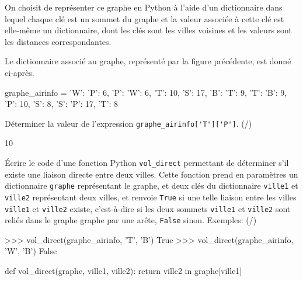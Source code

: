 On choisit de représenter ce graphe en Python à l'aide d'un dictionnaire dans lequel chaque clé est un sommet du graphe et la valeur associée à cette clé est elle-même un dictionnaire, dont les clés sont les villes voisines et les valeurs sont les distances correspondantes.


Le dictionnaire associé au graphe, représenté par la figure précédente, est donné ci-après.

\begin{CodePythontexAlt}[TaillePolice=\large, Largeur=1\linewidth,Centre,Lignes=true,PremLigne=1]{}
graphe_airinfo = {     
    'W': {'P': 6}, 
    'P': {'W': 6, 'T': 10, 'S': 17}, 
    'B': {'T': 9}, 
    'T': {'B': 9, 'P': 10, 'S': 8}, 
    'S': {'P': 17, 'T': 8}     }
    \end{CodePythontexAlt}

\begin{enumerate}[resume=monDS]
    \begin{minipage}{0.69\linewidth}
            \item Déterminer la valeur de l'expression \verb|graphe_airinfo['T']['P']|. (/)

    \end{minipage}\hfill
    \begin{minipage}{0.29\linewidth}
    \begin{blocvisible}[height=1]
     10
\end{blocvisible}
        \end{minipage}
\item Écrire le code d'une fonction Python \texttt{vol\_direct} permettant de déterminer s'il existe une liaison directe entre deux villes. Cette fonction prend en paramètres un dictionnaire \texttt{graphe} représentant le graphe, et deux clés du dictionnaire \texttt{ville1} et \texttt{ville2} représentant deux villes, et renvoie \texttt{True} si une telle liaison entre les villes \texttt{ville1} et \texttt{ville2} existe, c'est-à-dire si les deux sommets \texttt{ville1} et \texttt{ville2} sont reliés dans le graphe graphe par une arête, \texttt{False} sinon. Exemples: (/)
    \begin{CodePythontexAlt}[TaillePolice=\large, Largeur=1\linewidth,Centre,Lignes=true,PremLigne=1]{}
>>> vol_direct(graphe_airinfo, 'T', 'B') 
True 
>>> vol_direct(graphe_airinfo, 'W', 'B') 
False
    \end{CodePythontexAlt}

\begin{blocvisible}[height=3.5]
\begin{CodePythontexAlt}[TaillePolice=\large, Largeur=1\linewidth,Centre,Lignes=true,PremLigne=1]{}
def vol_direct(graphe, ville1, ville2):
    return ville2 in graphe[ville1]
\end{CodePythontexAlt}
\end{blocvisible}


\end{enumerate}

